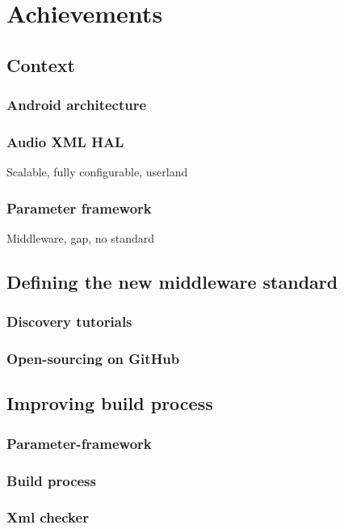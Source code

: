 \chapter{Achievements}

\section{Context}

\subsection{Android architecture}

\subsection{Audio XML HAL}
Scalable, fully configurable, userland

\subsection{Parameter framework}
Middleware, gap, no standard



\section{Defining the new middleware standard}
\subsection{Discovery tutorials}
\subsection{Open-sourcing on GitHub}

\section{Improving build process}
\subsection{Parameter-framework}
\subsection{Build process}
\subsection{Xml checker}

